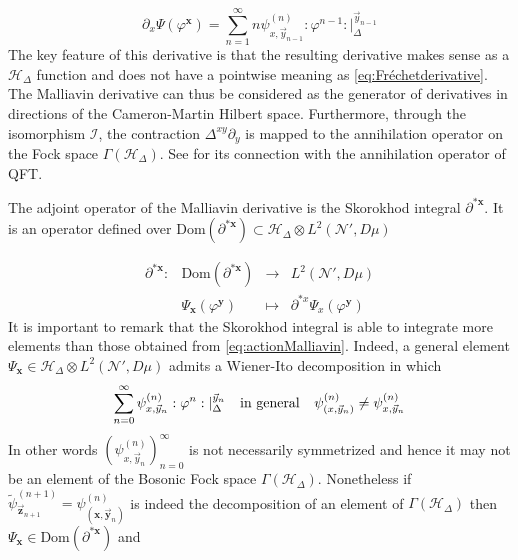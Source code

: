 \documentclass{elsarticle}%
\begin{document}
\begin{equation}
\label{eq:actionMalliavin}
\partial_x\Psi(\varphi^\mathbf{x})=\sum_{n=1}^\infty n\psi^{(n)}_{x,\vec{y}_{n-1}}:\varphi^{n-1}:\lvert_\Delta^{\vec{y}_{n-1}}
\end{equation}
The key feature of this derivative is that the resulting derivative makes sense as a $\mathcal{H}_\Delta$ function and does not have a pointwise meaning as  \eqref{eq:Fréchetderivative}. The Malliavin derivative can thus be considered as the generator of derivatives in directions of the Cameron-Martin Hilbert space. Furthermore, through the isomorphism $\mathcal{I}$, the contraction $\Delta^{xy}\partial_y$ is mapped to the annihilation operator on the Fock space $\Gamma(\mathcal{H}_\Delta)$. See \cite{alonsoGeometricFlavours2024} for its connection with the annihilation operator of QFT.


The adjoint operator of the Malliavin derivative is the Skorokhod integral $\partial^{*\mathbf{x}}$. It is an operator defined over $\textrm{Dom}(\partial^{*\mathbf{x}})\subset\mathcal{H}_\Delta\otimes L^2(\mathcal{N}',D\mu)$ 

\begin{equation}
    \label{eq:SkorokhodIntegral}
    \begin{array}{cccc}
        \partial^{*\mathbf{x}}:& \textrm{Dom}(\partial^{*\mathbf{x}}) &\longrightarrow &L^2(\mathcal{N}',D\mu)\\
         & \Psi_{\mathbf{x}}(\varphi^{\mathbf{y}}) & \longmapsto & \partial^{*{x}} \Psi_{x}(\varphi^{\mathbf{y}})
    \end{array}
\end{equation}
It is important to remark that the Skorokhod integral is able to integrate more elements than those obtained from \eqref{eq:actionMalliavin}. Indeed, a general element $\Psi_{\mathbf{x}}\in\mathcal{H}_\Delta\otimes L^2(\mathcal{N}',D\mu)$ admits a Wiener-Ito decomposition in which 
\begin{equation}
\label{eq:parametricWienerIto}
\sum_{n=0}^\infty\psi^{(n)}_{x,\vec{y}_n}:\varphi^n:\lvert_\Delta^{\vec{y}_n}\hspace{0.25 cm} \textrm{ in general } \hspace{0.25 cm}  \psi^{(n)}_{(x,\vec{y}_n)}\neq \psi^{(n)}_{x,\vec{y}_n}
\end{equation}
In other words $(\psi^{(n)}_{x,\vec{y}_n})_{n=0}^\infty$ is not necessarily symmetrized and hence it may not be an  element of the Bosonic Fock space $\Gamma(\mathcal{H}_\Delta)$. Nonetheless if  
$\tilde{\psi}^{(n+1)}_{\vec{\mathbf{z}}_{n+1}}=\psi^{(n)}_{(\mathbf{x},\vec{\mathbf{y}}_n)}$ is indeed the decomposition of an element of $\Gamma(\mathcal{H}_\Delta)$ then $\Psi_{\mathbf{x}}\in  \textrm{Dom}(\partial^{*\mathbf{x}})$ and 
\end{document}
